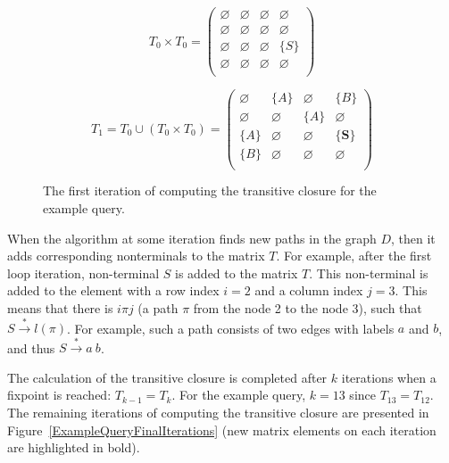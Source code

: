 \begin{figure}[h]
\[
T_0 \times T_0 = \begin{pmatrix}
	\varnothing & \varnothing & \varnothing & \varnothing \\
	\varnothing & \varnothing & \varnothing & \varnothing \\
	\varnothing & \varnothing & \varnothing & \{S\}       \\
	\varnothing & \varnothing & \varnothing & \varnothing \\
\end{pmatrix}
\]

\[
T_1 = T_0 \cup (T_0 \times T_0) = \begin{pmatrix}
	\varnothing & \{A\}       & \varnothing & \{B\}       \\
	\varnothing & \varnothing & \{A\}       & \varnothing \\
	\{A\}       & \varnothing & \varnothing & \{\pmb{S}\}       \\
	\{B\}       & \varnothing & \varnothing & \varnothing \\
\end{pmatrix}
\]
\caption{The first iteration of computing the transitive closure for the example query.}
\label{ExampleQueryFirstIteration}
\end{figure}

When the algorithm at some iteration finds new paths in the graph $D$, then it adds corresponding nonterminals to the matrix $T$. For example, after the first loop iteration, non-terminal $S$ is added to the matrix $T$. This non-terminal is added to the element with a row index $i = 2$ and a column index $j = 3$. This means that there is $i\pi j$ (a path $\pi$ from the node 2 to the node 3), such that $S \xrightarrow{*} l(\pi)$. For example, such a path consists of two edges with labels $a$ and $b$, and thus $S \xrightarrow{*} a \ b$.

The calculation of the transitive closure is completed after $k$ iterations when a fixpoint is reached: $T_{k-1} = T_k$. For the example query, $k = 13$ since $T_13 = T_12$. The remaining iterations of computing the transitive closure are presented in Figure~\ref{ExampleQueryFinalIterations} (new matrix elements on each iteration are highlighted in bold).

